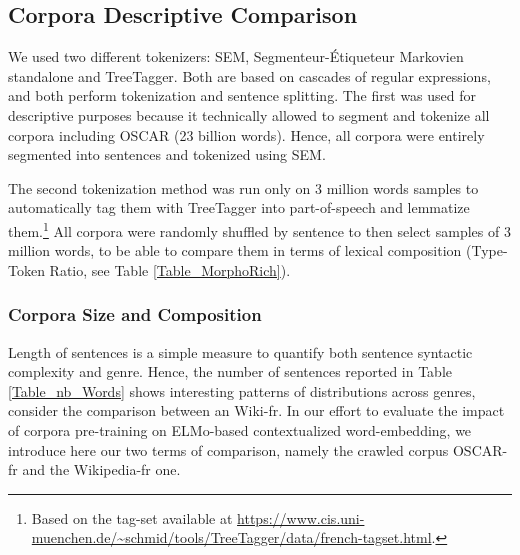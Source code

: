 \subsection{Corpora Descriptive Comparison} \label{sec:CompareCorpora}

We used two different tokenizers: SEM, Segmenteur-Étiqueteur Markovien standalone \citet{dupont-2017-exploration} and TreeTagger. Both are based on cascades of regular expressions, and both perform tokenization and sentence splitting.
The first was used for descriptive purposes because it technically allowed to segment and tokenize all corpora including OSCAR (23 billion words). Hence, all corpora were entirely segmented into sentences and tokenized using SEM.

The second tokenization method was run only on 3 million words samples to automatically tag them with TreeTagger into part-of-speech and lemmatize them.\footnote{Based on the tag-set available at \url{https://www.cis.uni-muenchen.de/~schmid/tools/TreeTagger/data/french-tagset.html}.} All corpora were randomly shuffled by sentence to then select samples of 3 million words, to be able to compare them in terms of lexical composition (Type-Token Ratio, see Table \ref{Table_MorphoRich}).

\subsubsection{Corpora Size and Composition}

Length of sentences is a simple measure to quantify both sentence syntactic complexity and genre. Hence, the number of sentences reported in Table \ref{Table_nb_Words} shows interesting patterns of distributions across genres, consider the comparison between \Cabernet an Wiki-fr.
In our effort to evaluate the impact of corpora pre-training on ELMo-based contextualized word-embedding, we introduce here our two terms of comparison, namely the crawled corpus OSCAR-fr and the Wikipedia-fr one.

